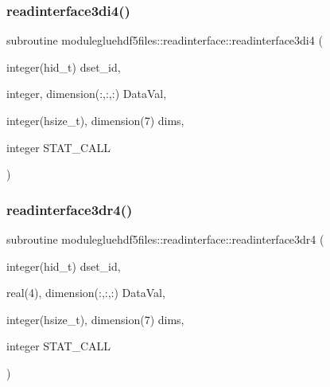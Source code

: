 \subsubsection{\texorpdfstring{readinterface3di4()}{readinterface3di4()}}
{\footnotesize\ttfamily subroutine modulegluehdf5files\+::readinterface\+::readinterface3di4 (\begin{DoxyParamCaption}\item[{integer(hid\+\_\+t)}]{dset\+\_\+id,  }\item[{integer, dimension(\+:,\+:,\+:)}]{Data\+Val,  }\item[{integer(hsize\+\_\+t), dimension(7)}]{dims,  }\item[{integer}]{S\+T\+A\+T\+\_\+\+C\+A\+LL }\end{DoxyParamCaption})\hspace{0.3cm}{\ttfamily [private]}}

\mbox{\label{interfacemodulegluehdf5files_1_1readinterface_ac78cdfc260e975f4393d59d4de8aae2d}} 
\subsubsection{\texorpdfstring{readinterface3dr4()}{readinterface3dr4()}}
{\footnotesize\ttfamily subroutine modulegluehdf5files\+::readinterface\+::readinterface3dr4 (\begin{DoxyParamCaption}\item[{integer(hid\+\_\+t)}]{dset\+\_\+id,  }\item[{real(4), dimension(\+:,\+:,\+:)}]{Data\+Val,  }\item[{integer(hsize\+\_\+t), dimension(7)}]{dims,  }\item[{integer}]{S\+T\+A\+T\+\_\+\+C\+A\+LL }\end{DoxyParamCaption})\hspace{0.3cm}{\ttfamily [private]}}

\mbox{\label{interfacemodulegluehdf5files_1_1readinterface_acc31aac7a89379268183c9337f550043}} 
